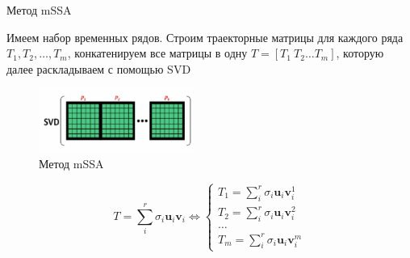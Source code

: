 	\begin{frame}{Метод mSSA}
		
		Имеем набор временных рядов. Строим траекторные матрицы для каждого ряда $ T_1, T_2, \ldots , T_m  $, конкатенируем все матрицы в одну $ T = [T_1 \  T_2 \ldots T_m] $, которую далее раскладываем с помощью SVD
		
		
		\begin{figure}
			\centering
			\includegraphics[width=0.45\textwidth, keepaspectratio]{../../figs/mSSA_demonst.png}
			\caption{Метод mSSA}\label{pic:mSSA_dem}
		\end{figure}
		
		\begin{equation*}
			T = \sum\limits_i^{r} \sigma_i \mathbf{u}_i \mathbf{v}_i \Leftrightarrow \begin{cases}
				T_1 = \sum\limits_i^{r} \sigma_i \mathbf{u}_i \mathbf{v}_i^1 \\
				T_2 = \sum\limits_i^{r} \sigma_i \mathbf{u}_i \mathbf{v}_i^2 \\
				\ldots \\
				T_m = \sum\limits_i^{r} \sigma_i \mathbf{u}_i \mathbf{v}_i^m
			\end{cases}
		\end{equation*}
		
	\end{frame}
	
